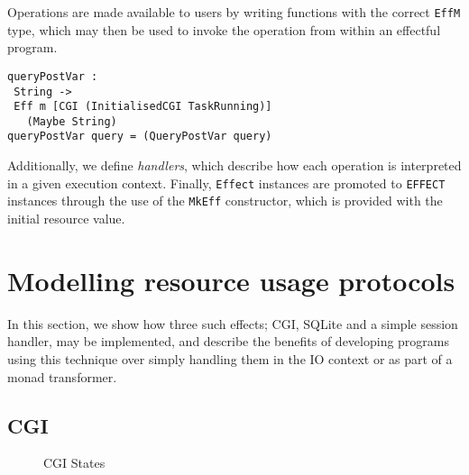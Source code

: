 \documentclass[preprint]{sigplanconf}
\begin{document}
Operations are made available to users by writing functions with the correct \texttt{EffM} type, which may then be used to invoke the operation from within an effectful program.

\begin{verbatim}
queryPostVar : 
 String -> 
 Eff m [CGI (InitialisedCGI TaskRunning)] 
   (Maybe String)
queryPostVar query = (QueryPostVar query)
\end{verbatim}

Additionally, we define \textit{handlers}, which describe how each operation is interpreted in a given execution context. Finally, \texttt{Effect} instances are promoted to \texttt{EFFECT} instances through the use of the \texttt{MkEff} constructor, which is provided with the initial resource value.


\section{Modelling resource usage protocols}
In this section, we show how three such effects; CGI, SQLite and a simple session handler, may be implemented, and describe the benefits of developing programs using this technique over simply handling them in the IO context or as part of a monad transformer.


\subsection{CGI}
\begin{figure}[htpb!]
\centering
{}
\caption{CGI States}
\label{fig:cgistates}
\end{figure}
\end{document}
